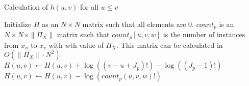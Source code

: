 \begin{algorithm}
  \caption{ Calculation of $h(u,v)$ for all $u \leq v$}
  \label{alg:h}
  \begin{algorithmic}[1]
  \State Initialize $H$ as an $N \times N$ matrix such that all elements are 0.
  \State $count_p$ is an $N \times N \times \|\Pi_X\|$ matrix such that $count_p [u,v,w]$ is the number of instances from $x_u$ to $x_v$ with $w$th value of $\Pi_X$. This matrix can be calculated in $O(\|\Pi_X\| \cdot N^2)$
      \State $H(u,v) \leftarrow H(u,v) + \log((v-u + J_p)!) - \log((J_p -1)!)$
        \State $H(u,v) \leftarrow H(u,v) - \log( count_p(u,v,w)!)$
      \EndFor
    \EndFor
  \EndFor
    \State {}
  \EndFor
  \end{algorithmic}
\end{algorithm}




